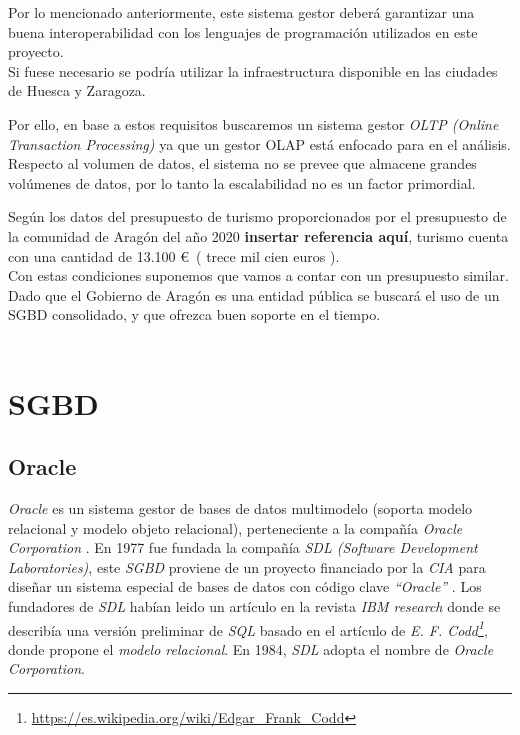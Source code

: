\documentclass[10pt]{article}
\begin{document}
Por lo mencionado anteriormente, este sistema gestor deberá garantizar una buena interoperabilidad con los lenguajes de programación utilizados en este proyecto. \\

Si fuese necesario se podría utilizar la infraestructura disponible en las ciudades de Huesca y Zaragoza.

Por ello, en base a estos requisitos buscaremos un sistema gestor \textit{OLTP (Online Transaction Processing)} ya que un gestor OLAP está enfocado para en el análisis. Respecto al volumen de datos, el sistema no se prevee que almacene grandes volúmenes de datos, por lo tanto la escalabilidad no es un factor primordial.

Según los datos del presupuesto de turismo proporcionados por el presupuesto de la comunidad de Aragón del año 2020 \textbf{insertar referencia aquí}, turismo cuenta con una cantidad de 13.100 \euro \ ( trece mil cien euros ).\\
Con estas condiciones suponemos que vamos a contar con un presupuesto similar.\\

Dado que el Gobierno de Aragón es una entidad pública se buscará el uso de un SGBD consolidado, y que ofrezca buen soporte en el tiempo. \\\\

\section{SGBD}

\subsection{Oracle}

\emph{Oracle} es un sistema gestor de bases de datos multimodelo (soporta modelo relacional y modelo objeto relacional), perteneciente a la compañía \emph{Oracle Corporation} \cite{WIKI:1} . En 1977 fue fundada la compañía \emph{SDL (Software Development Laboratories)}, este \emph{SGBD} proviene de un proyecto financiado por la \emph{CIA} para diseñar un sistema especial de bases de datos con código clave \emph{``Oracle''} \cite{WIKI:2}. Los fundadores de \emph{SDL} habían leido un artículo en la revista \emph{IBM research} donde se describía una versión preliminar de \emph{SQL} basado en el artículo de \emph{E. F. Codd\footnote{\url{https://es.wikipedia.org/wiki/Edgar_Frank_Codd}}}, donde propone el \emph{modelo relacional}. En 1984, \emph{SDL} adopta el nombre de \emph{Oracle Corporation}.\\
\end{document}
